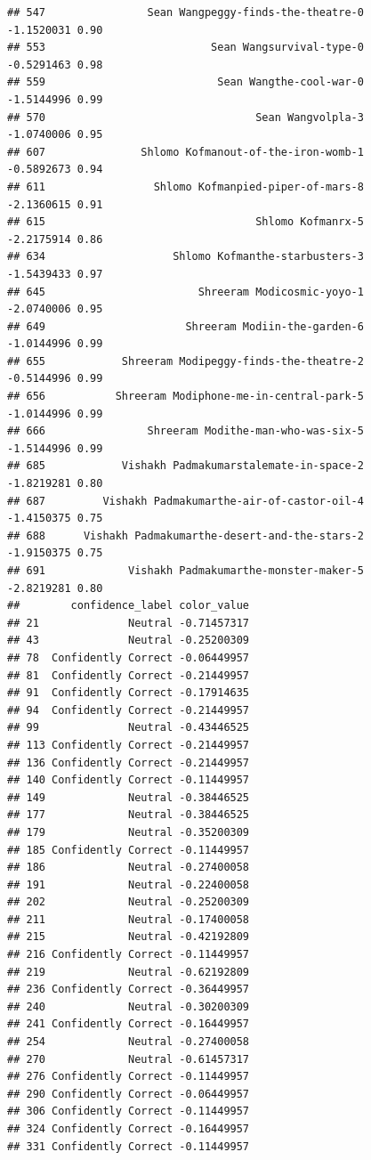 \documentclass[
]{article}
\begin{document}
\begin{verbatim}
## 547                Sean Wangpeggy-finds-the-theatre-0         -1.1520031 0.90
## 553                          Sean Wangsurvival-type-0         -0.5291463 0.98
## 559                           Sean Wangthe-cool-war-0         -1.5144996 0.99
## 570                                 Sean Wangvolpla-3         -1.0740006 0.95
## 607               Shlomo Kofmanout-of-the-iron-womb-1         -0.5892673 0.94
## 611                 Shlomo Kofmanpied-piper-of-mars-8         -2.1360615 0.91
## 615                                 Shlomo Kofmanrx-5         -2.2175914 0.86
## 634                    Shlomo Kofmanthe-starbusters-3         -1.5439433 0.97
## 645                        Shreeram Modicosmic-yoyo-1         -2.0740006 0.95
## 649                      Shreeram Modiin-the-garden-6         -1.0144996 0.99
## 655            Shreeram Modipeggy-finds-the-theatre-2         -0.5144996 0.99
## 656           Shreeram Modiphone-me-in-central-park-5         -1.0144996 0.99
## 666                Shreeram Modithe-man-who-was-six-5         -1.5144996 0.99
## 685            Vishakh Padmakumarstalemate-in-space-2         -1.8219281 0.80
## 687         Vishakh Padmakumarthe-air-of-castor-oil-4         -1.4150375 0.75
## 688      Vishakh Padmakumarthe-desert-and-the-stars-2         -1.9150375 0.75
## 691             Vishakh Padmakumarthe-monster-maker-5         -2.8219281 0.80
##        confidence_label color_value
## 21              Neutral -0.71457317
## 43              Neutral -0.25200309
## 78  Confidently Correct -0.06449957
## 81  Confidently Correct -0.21449957
## 91  Confidently Correct -0.17914635
## 94  Confidently Correct -0.21449957
## 99              Neutral -0.43446525
## 113 Confidently Correct -0.21449957
## 136 Confidently Correct -0.21449957
## 140 Confidently Correct -0.11449957
## 149             Neutral -0.38446525
## 177             Neutral -0.38446525
## 179             Neutral -0.35200309
## 185 Confidently Correct -0.11449957
## 186             Neutral -0.27400058
## 191             Neutral -0.22400058
## 202             Neutral -0.25200309
## 211             Neutral -0.17400058
## 215             Neutral -0.42192809
## 216 Confidently Correct -0.11449957
## 219             Neutral -0.62192809
## 236 Confidently Correct -0.36449957
## 240             Neutral -0.30200309
## 241 Confidently Correct -0.16449957
## 254             Neutral -0.27400058
## 270             Neutral -0.61457317
## 276 Confidently Correct -0.11449957
## 290 Confidently Correct -0.06449957
## 306 Confidently Correct -0.11449957
## 324 Confidently Correct -0.16449957
## 331 Confidently Correct -0.11449957

\end{verbatim}
\end{document}
